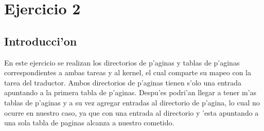 \documentclass[11pt]{article}
\begin{document}
\newpage

\section{Ejercicio 2}
\subsection{Introducci'on} En este ejercicio se realizan los directorios de p'aginas y tablas de p'aginas correspondientes a ambas tareas y al kernel, el cual comparte su mapeo con la tarea del traductor. Ambos directorios de p'aginas tienen s'olo una entrada apuntando a la primera tabla de p'aginas. Despu'es podri'an llegar a tener m'as tablas de p'aginas y a su vez agregar entradas al directorio de p'agina, lo cual no ocurre en nuestro caso, ya que con una entrada al directorio y 'esta apuntando a una sola tabla de paginas alcanza a nuestro cometido.
\end{document}
